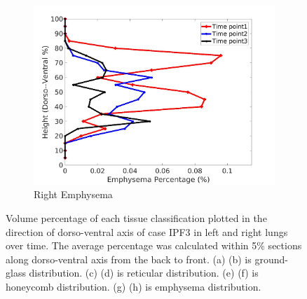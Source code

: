 \begin{figure}[H]
\begin{subfigure}{.42\linewidth}
  \includegraphics[width=\linewidth,trim={{.0\wd0} {.0\wd0} {.0\wd0} {.0\wd0}},clip]{Appendix/Image_AppexA/DorsoToVentral/IPF3RightLungEmphysemaDiseaseDorsoToVentral.jpg}
  \caption{Right Emphysema}
  \label{fig:IPF3DiseaseDorsoToVentral-h}
\end{subfigure}
\caption{Volume percentage of each tissue classification plotted in the direction of dorso-ventral axis of case IPF3 in left and right lungs over time. The average percentage was calculated within 5\% sections along dorso-ventral axis from the back to front. (a) (b) is ground-glass distribution. (c) (d) is reticular distribution. (e) (f) is honeycomb distribution. (g) (h) is emphysema distribution.}
\label{fig:IPF3DiseaseDorsoToVentral}
\end{figure}

